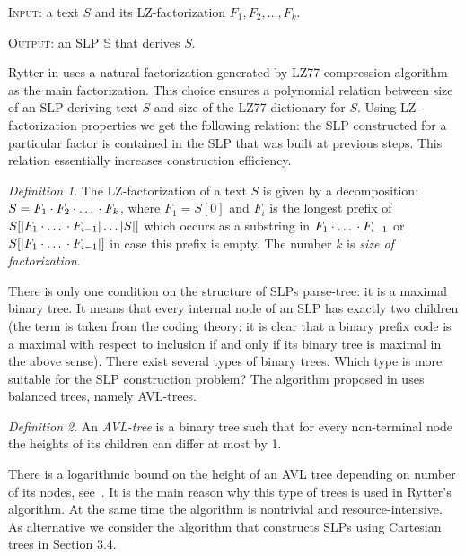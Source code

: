 ﻿\documentclass[11pt]{article}
\theoremstyle{remark}
\newtheorem{definition}{Definition}[section]
\newcommand{\substr}[2]{[#1\dots#2]}
\newcommand{\slp}[1]{\mathbb{#1}}
\begin{document}
\noindent \textsc{Input:} a text $S$ and its LZ-factorization $F_1, F_2, \dots, F_k$.

\noindent \textsc{Output:} an SLP $\slp{S}$ that derives $S$.

Rytter in \cite{SLPConstruction} uses a natural factorization generated by LZ77 compression algorithm as the main
factorization. This choice ensures a polynomial relation between size of an SLP deriving text $S$ and size of the LZ77
dictionary for $S$. Using LZ-factorization properties we get the following relation: the SLP constructed for a particular
factor is contained in the SLP that was built at previous steps. This relation essentially increases construction efficiency. 

\begin{definition}
The LZ-factorization of a text $S$ is given by a decomposition: $S = F_1 \cdot F_2 \cdot \mbox{\dots} \cdot F_k$, where
$F_1 = S[0]$ and $F_i$ is the longest prefix of $S\substr{|F_1\cdot \mbox{\dots} \cdot F_{i-1}|}{|S|}$ which occurs as a
substring in $F_1 \cdot \mbox{\dots} \cdot F_{i-1}$ or $S[|F_1\cdot \mbox{\dots} \cdot F_{i-1}|]$ in case this prefix is
empty. The number $k$ is \emph{size of factorization}.
\end{definition}

There is only one condition on the structure of SLPs parse-tree: it is a maximal binary tree. It means that every internal
node of an SLP has exactly two children (the term is taken from the coding theory: it is clear that a binary prefix code
is a maximal with respect to inclusion if and only if its binary tree is maximal in the above sense). There exist several types
of binary trees. Which type is more suitable for the SLP construction problem? The algorithm proposed in
\cite{SLPConstruction} uses balanced trees, namely AVL-trees.

\begin{definition}
An \emph{AVL-tree} is a binary tree such that for every non-terminal node the heights of its children
can differ at most by 1.
\end{definition}

There is a logarithmic bound on the height of an AVL tree depending on number of its nodes, see~\cite{Knuth}. It is the main
reason why this type of trees is used in Rytter's algorithm. At the same time the algorithm is nontrivial and
resource-intensive. As alternative we consider the algorithm that constructs SLPs using Cartesian trees in Section
3.4.
\end{document}
